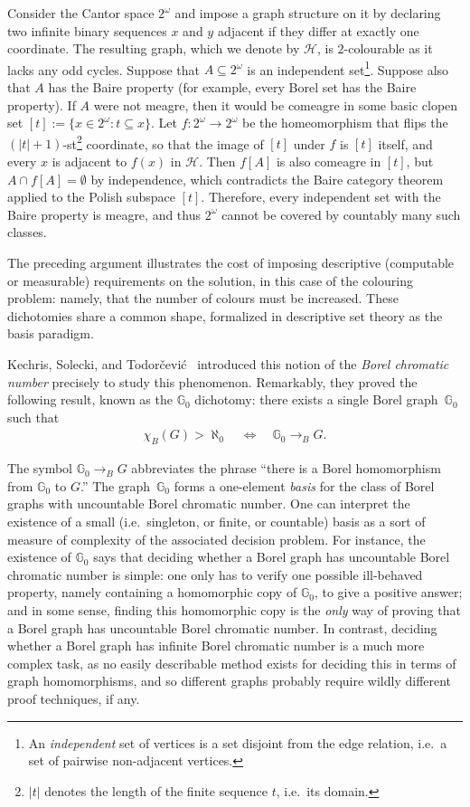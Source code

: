 Consider the Cantor space $2^\omega$ and impose a graph structure on it by declaring two infinite binary sequences $x$ and $y$ adjacent if they differ at exactly one coordinate.
The resulting graph, which we denote by $\mathcal H$, is $2$-colourable as it lacks any odd cycles.
Suppose that $A\subseteq 2^\omega$ is an independent set\footnote{An \emph{independent} set of vertices is a set disjoint from the edge relation, i.e.\ a set of pairwise non-adjacent vertices.}.
Suppose also that $A$ has the Baire property (for example, every Borel set has the Baire property).
If $A$ were not meagre, then it would be comeagre in some basic clopen set $[t]:=\{x\in2^\omega:t\subseteq x\}$.
Let $f\colon2^\omega\to2^\omega$ be the homeomorphism that flips the $(|t|+1)$-st\footnote{$|t|$ denotes the length of the finite sequence $t$, i.e.\ its domain.} coordinate, so that the image of $[t]$ under $f$ is $[t]$ itself, and every $x$ is adjacent to $f(x)$ in $\mathcal H$.
Then $f[A]$ is also comeagre in $[t]$, but $A\cap f[A]=\emptyset$ by independence, which contradicts the Baire category theorem applied to the Polish subspace $[t]$.
Therefore, every independent set with the Baire property is meagre, and thus $2^\omega$ cannot be covered by countably many such classes.

The preceding argument illustrates the cost of imposing descriptive (computable or measurable) requirements on the solution, in this case of the colouring problem: namely, that the number of colours must be increased.
These dichotomies share a common shape, formalized in descriptive set theory as the basis paradigm.

Kechris, Solecki, and Todor{\v{c}}evi{\'c}~\cite{kechris1999borel} introduced this notion of the \emph{Borel chromatic number} precisely to study this phenomenon.
Remarkably, they proved the following result, known as the $\mathbb{G}_0$ dichotomy: there exists a single Borel graph~$\mathbb{G}_0$ such that
\begin{align*}
    \chi_B(G) > \aleph_0\quad
    \Longleftrightarrow\quad
    \mathbb{G}_0 \to_B G.
\end{align*}

The symbol $\mathbb{G}_0 \to_B G$ abbreviates the phrase ``there is a Borel homomorphism from $\mathbb{G}_0$ to $G$.''
The graph~$\mathbb{G}_0$ forms a one-element \emph{basis} for the class of Borel graphs with uncountable Borel chromatic number.
One can interpret the existence of a small (i.e.\ singleton, or finite, or countable) basis as a sort of measure of complexity of the associated decision problem.
For instance, the existence of $\mathbb{G}_0$ says that deciding whether a Borel graph has uncountable Borel chromatic number is simple: one only has to verify one possible ill-behaved property, namely containing a homomorphic copy of $\mathbb{G}_0$, to give a positive answer; and in some sense, finding this homomorphic copy is the \emph{only} way of proving that a Borel graph has uncountable Borel chromatic number.
In contrast, deciding whether a Borel graph has infinite Borel chromatic number is a much more complex task, as no easily describable method exists for deciding this in terms of graph homomorphisms, and so different graphs probably require wildly different proof techniques, if any.

